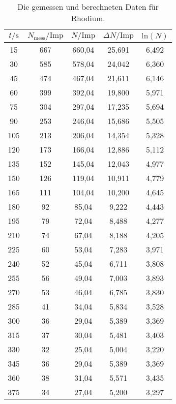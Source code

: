   \begin{table}[H]
    \centering
    \caption{Die gemessen und berechneten Daten für Rhodium.}
    \label{tab:Rhodium}
    \begin{tabular}{| c | c | c  | c| c| }
    \toprule
    $t/\mathrm{s}$ & $N_\text{mess}/\mathrm{Imp}$ &  $N/\mathrm{Imp}$ &  $\Delta N/\mathrm{Imp}$ &  $\text{ln}(N)$ \\
    \midrule
  15	&   667	&   660,04	&   25,691	&   6,492  \\
  30	&   585	&   578,04	&   24,042	&   6,360  \\
  45	&   474	&   467,04	&   21,611	&   6,146  \\
  60	&   399	&   392,04	&   19,800	&   5,971  \\
  75	&   304	&   297,04	&   17,235	&   5,694  \\
  90	&   253	&   246,04	&   15,686	&   5,505  \\
  105	&   213	&   206,04	&   14,354	&   5,328  \\
  120	&   173	&   166,04	&   12,886	&   5,112  \\
  135	&   152	&   145,04	&   12,043	&   4,977  \\
  150	&   126	&   119,04	&   10,911	&   4,779  \\
  165	&   111	&   104,04	&   10,200	&   4,645  \\
  180	&   92	&   85,04	  &   9,222	  &   4,443  \\
  195	&   79	&   72,04	  &   8,488	  &   4,277  \\
  210	&   74	&   67,04	  &   8,188	  &   4,205  \\
  225	&   60	&   53,04	  &   7,283	  &   3,971  \\
  240	&   52	&   45,04	  &   6,711	  &   3,808  \\
  255	&   56	&   49,04	  &   7,003	  &   3,893  \\
  270	&   53	&   46,04	  &   6,785	  &   3,830  \\
  285	&   41	&   34,04	  &   5,834	  &   3,528  \\ 
  300	&   36	&   29,04	  &   5,389	  &   3,369  \\
  315	&   37	&   30,04	  &   5,481	  &   3,403  \\
  330	&   32	&   25,04	  &   5,004	  &   3,220  \\
  345	&   36	&   29,04	  &   5,389	  &   3,369  \\
  360	&   38	&   31,04	  &   5,571	  &   3,435  \\
  375	&   34	&   27,04	  &   5,200	  &   3,297  \\

\end{tabular}
\end{table}
